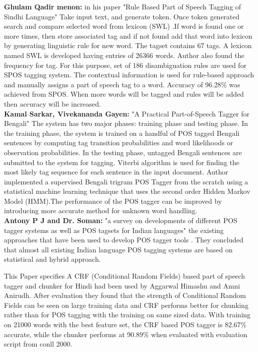 \documentclass[12pt,a4paper,oneside]{memoir}
\begin{document}
\textbf{Ghulam Qadir menon:} in his paper "Rule Based Part of Speech Tagging of Sindhi Language" Take input text, and generate token. Once token generated search and compare selected word from lexicon (SWL) .If word is found one or more times, then store associated tag and if not found add that word into lexicon by generating linguistic rule for new word. The tagset contains 67 tags. A lexicon named SWL is developed having entries of 26366 words. Author also found the frequency for tag. For this purpose, set of 186 disambiguation rules are used for SPOS tagging system. The contextual information is used for rule-based approach and manually assigns a part of speech tag to a word. Accuracy of 96.28\% was achieved from SPOS. When more words will be tagged and rules will be added then accuracy will be increased.\\


\textbf{Kamal Sarkar, Vivekananda Gayen:}  "A Practical Part-of-Speech Tagger for Bengali" The system has two major phases: training phase and testing phase. In the training phase, the system is trained on a handful of POS tagged Bengali sentences by computing tag transition probabilities and word likelihoods or observation probabilities. In the testing phase, untagged Bengali sentences are submitted to the system for tagging. Viterbi algorithm is used for finding the most likely tag sequence for each sentence in the input document. Author implemented a supervised Bengali trigram POS Tagger from the scratch using a statistical machine learning technique that uses the second order Hidden Markov Model (HMM).The performance of the POS tagger can be improved by introducing more accurate method for unknown word handling.\\


\textbf{Antony P J and Dr. Soman:} "a survey on developments of different POS tagger systems as well as POS tagsets for Indian languages" the existing approaches that have been used to develop POS tagger tools . They concluded that almost all existing Indian language POS tagging systems are based on statistical and hybrid approach. 

This Paper specifies A CRF (Conditional Random Fields) based part of speech tagger and chunker for Hindi had been used by Aggarwal Himashu and Amni Anirudh. After evaluation they found that the strength of Conditional Random Fields can be seen on large training data and CRF performs better for chunking rather than for POS tagging with the training on same sized data. With training on 21000 words with the best feature set, the CRF based POS tagger is 82.67\% accurate, while the chunker performs at 90.89\% when evaluated with evaluation script from conll 2000.\\
\end{document}
